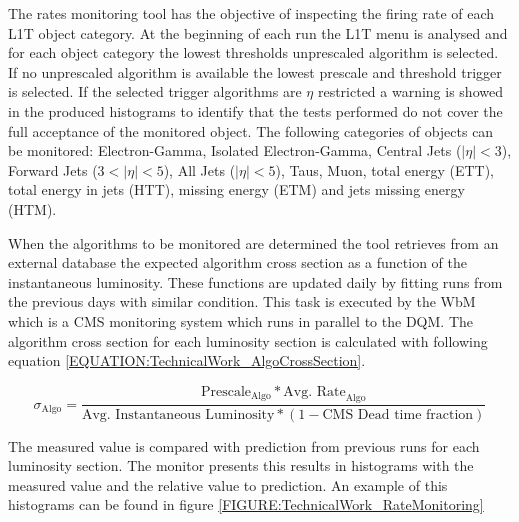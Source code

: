 
The rates monitoring tool has the objective of inspecting the firing rate of each \gls{L1T} object category. At the beginning of each run the \gls{L1T} menu is analysed and for each object category the lowest thresholds unprescaled algorithm is selected. If no unprescaled algorithm is available the lowest prescale and threshold trigger is selected. If the selected trigger algorithms are $\eta$ restricted a warning is showed in the produced histograms to identify that the tests performed do not cover the full acceptance of the monitored object. The following categories of objects can be monitored: Electron-Gamma, Isolated Electron-Gamma, Central Jets ($|\eta|<3$), Forward Jets ($3<|\eta|<5$), All Jets ($|\eta|<5$), Taus, Muon, total energy (ETT), total energy in jets (HTT), missing energy (ETM) and jets missing energy (HTM).

When the algorithms to be monitored are determined the tool retrieves from an external database the expected algorithm cross section as a function of the instantaneous luminosity. These functions are updated daily by fitting runs from the previous days with similar condition. This task is executed by the \gls{WbM} which is a \gls{CMS} monitoring system which runs in parallel to the \gls{DQM}. The algorithm cross section for each luminosity section is calculated with following equation \ref{EQUATION:TechnicalWork_AlgoCrossSection}.

\begin{equation}
\sigma_{\text{Algo}}=\frac{\text{Prescale}_{\text{Algo}}*{\text{Avg. Rate}_{\text{Algo}}}}{\text{Avg. Instantaneous Luminosity}*(1-\text{CMS Dead time fraction})}
\label{EQUATION:TechnicalWork_AlgoCrossSection}
\end{equation}

The measured value is compared with prediction from previous runs for each luminosity section. The monitor presents this results in histograms with the measured value and the relative value to prediction. An example of this histograms can be found in figure \ref{FIGURE:TechnicalWork_RateMonitoring}

